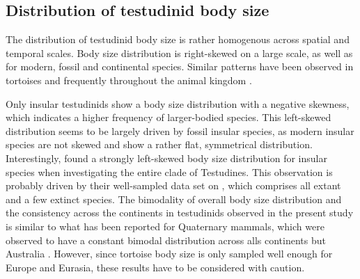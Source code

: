 






\subsection{Distribution of testudinid body size}

The distribution of testudinid body size is rather homogenous across spatial and temporal scales.
Body size distribution is right-skewed on a large scale, as well as for modern, fossil and continental species. Similar patterns have been observed in tortoises \citep{Angielczyk2015,Jaffe2011a} and frequently throughout the animal kingdom \citep{Blackburn1994a,Kozlowski2002}.

Only insular testudinids show a body size distribution with a negative skewness, which indicates a higher frequency of larger-bodied species. This left-skewed distribution seems to be largely driven by fossil insular species, as modern insular species are not skewed and show a rather flat, symmetrical distribution. Interestingly, \cite{Angielczyk2015} found a strongly left-skewed body size distribution for insular species when investigating the entire clade of Testudines. This observation is probably driven by their well-sampled data set on \T, which comprises all extant and a few extinct species. 
The bimodality of overall body size distribution and the consistency across the continents in testudinids observed in the present study is similar to what has been reported for Quaternary mammals, which were observed to have a constant bimodal distribution across alls continents but Australia \citep{Lyons2008,Smith2004}.
However, since tortoise body size is only sampled well enough for Europe and Eurasia, these results have to be considered with caution.

